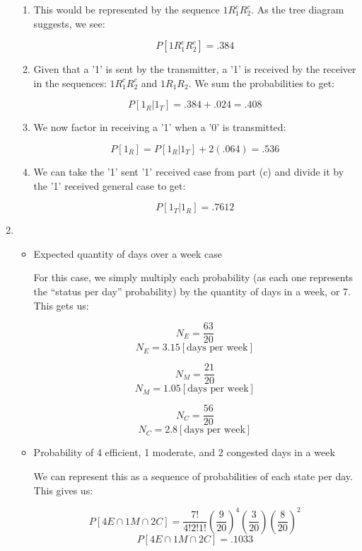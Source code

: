 \begin{enumerate}
\begin{enumerate}
      \item This would be represented by the sequence $1R_1^cR_2^c$. As the tree diagram suggests, we see:

        $$\boxed{P[1R_1^cR_2^c]=.384}$$

      \item Given that a '1' is sent by the transmitter, a '1' is received by the receiver in the sequences: $1R_1^cR_2^c$ and $1R_1R_2$. We sum the probabilities to get:

        $$\boxed{P[1_R|1_T]=.384+.024=.408}$$

      \item We now factor in receiving a '1' when a '0' is transmitted:

        $$\boxed{P[1_R]=P[1_R|1_T] + 2(.064)=.536}$$

      \item We can take the '1' sent '1' received case from part (c) and divide it by the '1' received general case to get:

        $$\boxed{P[1_T|1_R]=.7612}$$

    \end{enumerate}

  \item

    \begin{itemize}

      \item Expected quantity of days over a week case

        For this case, we simply multiply each probability (as each one represents the ``status per day'' probability) by the quantity of days in a week, or 7. This gets us:

        $$N_E=\frac{63}{20}$$
        $$\boxed{N_E=3.15[\text{days per week}]}$$

        $$N_M=\frac{21}{20}$$
        $$\boxed{N_M=1.05[\text{days per week}]}$$

        $$N_C=\frac{56}{20}$$
        $$\boxed{N_C=2.8[\text{days per week}]}$$

      \item Probability of 4 efficient, 1 moderate, and 2 congested days in a week

        We can represent this as a sequence of probabilities of each state per day. This gives us:

        $$P[4E \cap 1M\cap 2C]=\frac{7!}{4!2!1!}\left( \frac{9}{20} \right)^4\left( \frac{3}{20} \right)\left( \frac{8}{20} \right)^2$$
        $$\boxed{P[4E \cap 1M\cap 2C]=.1033}$$


\end{itemize}
\end{enumerate}
